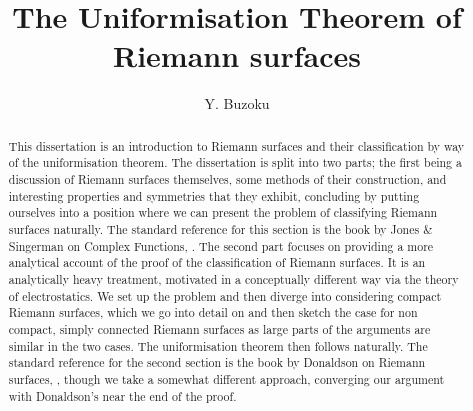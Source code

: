 \documentclass[11pt]{report}
\title{The Uniformisation Theorem of Riemann surfaces}
\author{Y. Buzoku}
\theoremstyle{definition}
\begin{document}
\maketitle
\setcounter{tocdepth}{1}  %
\tableofcontents

\newpage
\begin{abstract}
This dissertation is an introduction to Riemann surfaces and their classification by way of the uniformisation theorem. The dissertation is split into two parts; the first being a discussion of Riemann surfaces themselves, some methods of their construction, and interesting properties and symmetries that they exhibit, concluding by putting ourselves into a position where we can present the problem of classifying Riemann surfaces naturally. The standard reference for this section is the book by Jones \& Singerman on Complex Functions, \cite{comfun}. The second part focuses on providing a more analytical account of the proof of the classification of Riemann surfaces. It is an analytically heavy treatment, motivated in a conceptually different way via the theory of electrostatics. We set up the problem and then diverge into considering compact Riemann surfaces, which we go into detail on and then sketch the case for non compact, simply connected Riemann surfaces as large parts of the arguments are similar in the two cases. The uniformisation theorem then follows naturally. The standard reference for the second section is the book by Donaldson on Riemann surfaces, \cite{donaldson}, though we take a somewhat different approach, converging our argument with Donaldson's near the end of the proof. 
\end{abstract}
\declaration %
\end{document}
